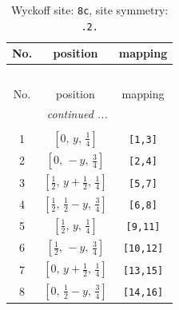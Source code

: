 \documentclass[fleqn,8pt]{jsarticle}
\begin{document}
\begin{longtable}{ccc}
\caption{Wyckoff site: {\tt 8c}, site symmetry: {\tt .2.}}
 \\
 \hline \hline
No. & position & mapping \\ \hline \endfirsthead

\multicolumn{2}{l}{\tablename\ \thetable{}} \\
 \hline \hline
No. & position & mapping \\ \hline \endhead

 \hline \hline
\multicolumn{2}{r}{\footnotesize\it continued ...} \\ \endfoot

 \hline \hline
\multicolumn{2}{r}{} \\ \endlastfoot

1 & $\left[ 0,\, y,\, \frac{1}{4} \right]$ & {\tt [1,3]} \\ \hline
2 & $\left[ 0,\, - y,\, \frac{3}{4} \right]$ & {\tt [2,4]} \\ \hline
3 & $\left[ \frac{1}{2},\, y + \frac{1}{2},\, \frac{1}{4} \right]$ & {\tt [5,7]} \\ \hline
4 & $\left[ \frac{1}{2},\, \frac{1}{2} - y,\, \frac{3}{4} \right]$ & {\tt [6,8]} \\ \hline
5 & $\left[ \frac{1}{2},\, y,\, \frac{1}{4} \right]$ & {\tt [9,11]} \\ \hline
6 & $\left[ \frac{1}{2},\, - y,\, \frac{3}{4} \right]$ & {\tt [10,12]} \\ \hline
7 & $\left[ 0,\, y + \frac{1}{2},\, \frac{1}{4} \right]$ & {\tt [13,15]} \\ \hline
8 & $\left[ 0,\, \frac{1}{2} - y,\, \frac{3}{4} \right]$ & {\tt [14,16]} \\
\end{longtable}
\renewcommand{\arraystretch}{1.2}
\end{document}
